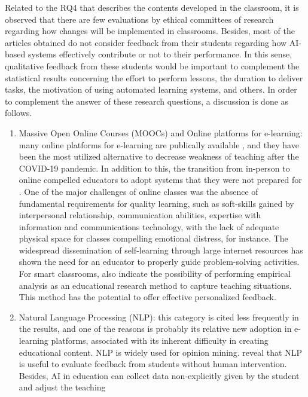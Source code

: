 \documentclass[english]{textolivre}
\begin{document}
Related to the RQ4 that describes the contents developed in the
classroom, it is observed that there are few evaluations by ethical
committees of research regarding how changes will be implemented in
classrooms. Besides, most of the articles obtained do not consider
feedback from their students regarding how AI-based systems effectively
contribute or not to their performance. In this sense, qualitative
feedback from these students would be important to complement the
statistical results concerning the effort to perform lessons, the
duration to deliver tasks, the motivation of using automated learning
systems, and others. In order to complement the answer of these research
questions, a discussion is done as follows.

\begin{enumerate}
    \item Massive Open Online Courses (MOOCs) and Online platforms for
  e-learning: many online platforms for e-learning are publically
  available \cite{Zhang2022,Shaik2022,Wu2021,Bhatnagar2023,Syzdykbayeva2021}, and they have been the most utilized alternative to decrease
  weakness of teaching after the COVID-19 pandemic. In addition to this,
  the transition from in-person to online compelled educators to adopt
  systems that they were not prepared for \cite{Pokhrel2021}. One of
  the major challenges of online classes was the absence of fundamental
  requirements for quality learning, such as soft-skills gained by
  interpersonal relationship, communication abilities, expertise with
  information and communications technology, with the lack of adequate
  physical space for classes compelling emotional distress, for
  instance. The widespread dissemination of self-learning through large
  internet resources has shown the need for an educator to properly
  guide problem-solving activities. For smart classrooms, \textcite{Zhang2022} also indicate the possibility of performing empirical
  analysis as an educational research method to capture teaching
  situations. This method has the potential to offer effective
  personalized feedback.
  \item Natural
Language Processing (NLP): this category is cited less frequently in the
results, and one of the reasons is probably its relative new adoption in
e-learning platforms, associated with its inherent difficulty in
creating educational content. NLP is widely used for opinion mining.
\textcite{Shaik2022} reveal that NLP is useful to evaluate feedback from
students without human intervention. Besides, AI in education can
collect data non-explicitly given by the student and adjust the teaching

\end{enumerate}
\end{document}
